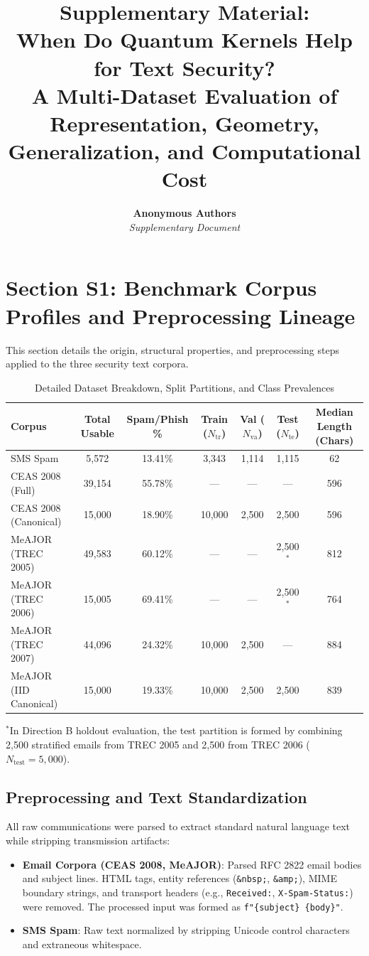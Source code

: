 \documentclass[10pt,letterpaper]{article}
\title{\textbf{Supplementary Material:\\When Do Quantum Kernels Help for Text Security?\\A Multi-Dataset Evaluation of Representation, Geometry, Generalization, and Computational Cost}}
\author{
  \textbf{Anonymous Authors} \\
  \textit{Supplementary Document}
}
\date{}
\begin{document}
\maketitle

\tableofcontents
\newpage

\section{Section S1: Benchmark Corpus Profiles and Preprocessing Lineage}
\label{sec:supp_datasets}

This section details the origin, structural properties, and preprocessing steps applied to the three security text corpora.

\begin{table}[h!]
\centering
\small
\caption{Detailed Dataset Breakdown, Split Partitions, and Class Prevalences}
\label{tab:supp_datasets_breakdown}
\begin{tabular}{lcccccc}
\toprule
\textbf{Corpus} & \textbf{Total Usable} & \textbf{Spam/Phish \%} & \textbf{Train ($N_{\text{tr}}$)} & \textbf{Val ($N_{\text{va}}$)} & \textbf{Test ($N_{\text{te}}$)} & \textbf{Median Length (Chars)} \\
\midrule
SMS Spam & 5,572 & 13.41\% & 3,343 & 1,114 & 1,115 & 62 \\
CEAS 2008 (Full) & 39,154 & 55.78\% & — & — & — & 596 \\
CEAS 2008 (Canonical) & 15,000 & 18.90\% & 10,000 & 2,500 & 2,500 & 596 \\
MeAJOR (TREC 2005) & 49,583 & 60.12\% & — & — & 2,500$^*$ & 812 \\
MeAJOR (TREC 2006) & 15,005 & 69.41\% & — & — & 2,500$^*$ & 764 \\
MeAJOR (TREC 2007) & 44,096 & 24.32\% & 10,000 & 2,500 & — & 884 \\
MeAJOR (IID Canonical) & 15,000 & 19.33\% & 10,000 & 2,500 & 2,500 & 839 \\
\bottomrule
\end{tabular}
\flushleft
\footnotesize{$^*$In Direction B holdout evaluation, the test partition is formed by combining 2,500 stratified emails from TREC 2005 and 2,500 from TREC 2006 ($N_{\text{test}} = 5,000$).}
\end{table}

\subsection{Preprocessing and Text Standardization}
All raw communications were parsed to extract standard natural language text while stripping transmission artifacts:
\begin{itemize}
    \item \textbf{Email Corpora (CEAS 2008, MeAJOR)}: Parsed RFC 2822 email bodies and subject lines. HTML tags, entity references (\texttt{\&nbsp;}, \texttt{\&amp;}), MIME boundary strings, and transport headers (e.g., \texttt{Received:}, \texttt{X-Spam-Status:}) were removed. The processed input was formed as \texttt{f"\{subject\} \{body\}"}.
    \item \textbf{SMS Spam}: Raw text normalized by stripping Unicode control characters and extraneous whitespace.
\end{itemize}
\end{document}
